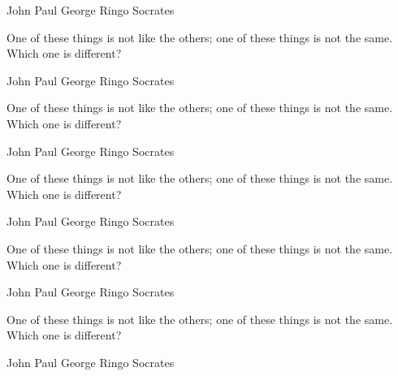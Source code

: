 \documentclass[answers,addpoints]{exam}
\begin{document}
\begin{questions}
\begin{randomizechoices}
\choice John
\choice Paul
\choice George
\choice Ringo
\CorrectChoice Socrates
\end{randomizechoices}

\question[5]
One of these things is not like the others; one of these
things is not the same. Which one is different?

\begin{randomizechoices}
\choice John
\choice Paul
\choice George
\choice Ringo
\CorrectChoice Socrates
\end{randomizechoices}

\question[5]
One of these things is not like the others; one of these
things is not the same. Which one is different?

\begin{choices}
\choice John
\choice Paul
\choice George
\choice Ringo
\CorrectChoice Socrates
\end{choices}

\question[5]
One of these things is not like the others; one of these
things is not the same. Which one is different?

\begin{randomizeoneparchoices}
\choice John
\choice Paul
\choice George
\choice Ringo
\CorrectChoice Socrates
\end{randomizeoneparchoices}

\question[5]
One of these things is not like the others; one of these
things is not the same. Which one is different?

\begin{oneparchoices}
\choice John
\choice Paul
\choice George
\choice Ringo
\CorrectChoice Socrates
\end{oneparchoices}

\question[5]
One of these things is not like the others; one of these
things is not the same. Which one is different?

\begin{randomizechoices}
\choice John
\choice Paul
\choice George
\choice Ringo
\CorrectChoice Socrates
\end{randomizechoices}


\end{questions}
\end{document}
